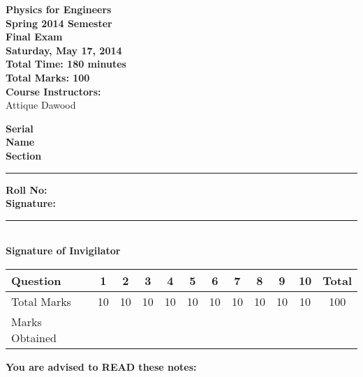 \documentclass[12pt,a4paper]{article}
\def\QOne{10}
\def\Qtwo{10}
\def\Qthree{10}
\def\Qfour{10}
\def\Qfive{10}
\def\Qsix{10}
\def\Qseven{10}
\def\Qeight{10}
\def\Qnine{10}
\def\Qten{10}
\def\TotalMarks{100}
\begin{document}
\begin{minipage}{0.55\textwidth}
{\LARGE \textbf{Physics for Engineers}}\\[0.15cm]
{\normalsize \textbf{Spring 2014 Semester}}\\
{\Large \textbf{Final Exam}}\\
{\normalsize \textbf{Saturday, May 17, 2014}}\\[0.30cm]
{\Large \textbf{Total Time: 180 minutes}}\\[0.15cm]
{\Large \textbf{Total Marks: 100}}\\
\textbf{Course Instructors:}\\
Attique Dawood\\
\end{minipage}
\begin{minipage}{0.4\textwidth}
\textbf{Serial} \hrulefill \\[0.25cm]
\textbf{Name} \hrulefill\\[0.25cm]
\textbf{Section} \rule{1cm}{0.2mm} \textbf{Roll No:} \hrulefill\\[0.25cm]
\textbf{Signature:} \hrulefill\\[0.25cm]
\rule{6.6cm}{0.2mm}\\
\textbf{Signature of Invigilator}\\[0.25cm]
\end{minipage}
\begin{table}[H]
\begin{center}
\vspace{0.3cm}
	{\large \begin{tabular}{|l|c|c|c|c|c|c|c|c|c|c|c|}
	\hline
		\rule{0pt}{2.6ex} Question & \textbf{1} & \textbf{2} & \textbf{3} & \textbf{4} & \textbf{5} & \textbf{6} & \textbf{7} & \textbf{8} & \textbf{9} & \textbf{10} & \textbf{Total}\\
		\hline
		Total Marks \rule{0pt}{2.6ex} & \QOne & \Qtwo & \Qthree & \Qfour & \Qfive & \Qsix & \Qseven & \Qeight & \Qnine & \Qten & \TotalMarks\\
		\hline
		Marks Obtained \rule{0pt}{2.6ex} & & & & & & & & & & &\\
	\hline
	\end{tabular}}
\end{center}
\end{table}
\noindent \textbf{You are advised to READ these notes:}
\end{document}
